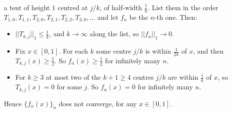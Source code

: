 \begin{problem}
\begin{solution}
\begin{enumerate}
    a tent of height $1$ centred at $j/k$, of half-width $\frac{1}{k}$. List them in the order $T_{1,0},T_{1,1},T_{2,0},T_{2,1},T_{2,2},T_{3,0},\ldots$ and let $f_n$ be the $n$-th one. Then:
    \begin{itemize}
        \item $||T_{k,j}||_1 \leq \frac{1}{k}$, and $k\to\infty$ along the list, so $||f_n||_1 \to 0$.
        \item Fix $x\in[0,1]$. For each $k$ some centre $j/k$ is within $\frac{1}{2k}$ of $x$, and then $T_{k,j}(x)\geq \frac{1}{2}$. So $f_n(x)\geq \frac{1}{2}$ for infinitely many $n$.
        \item For $k\geq 3$ at most two of the $k+1\geq 4$ centres $j/k$ are within $\frac{1}{k}$ of $x$, so $T_{k,j}(x)=0$ for some $j$. So $f_n(x)=0$ for infinitely many $n$.
    \end{itemize}
    Hence $\{f_n(x)\}_n$ does not converge, for any $x\in[0,1]$.
\end{enumerate}
\end{solution}
\end{problem}
